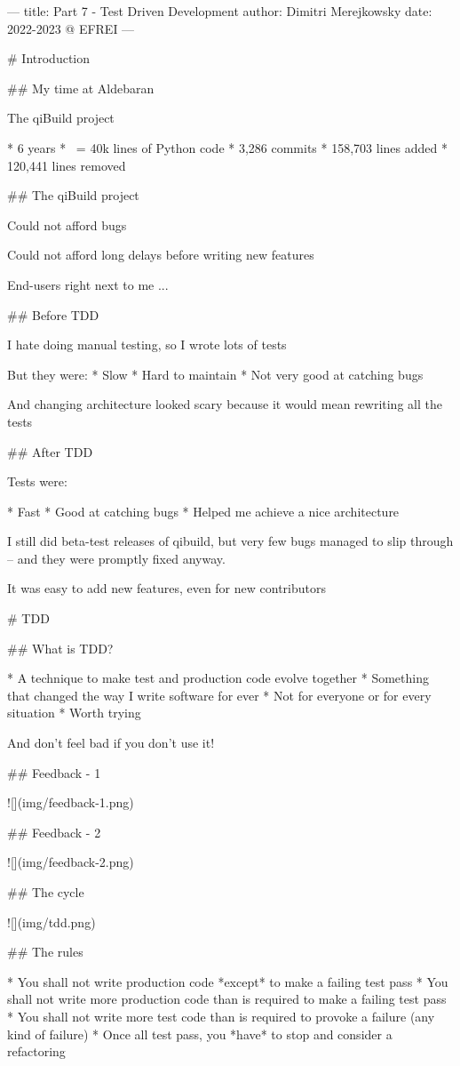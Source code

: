 ---
title: Part 7 - Test Driven Development
author: Dimitri Merejkowsky
date: 2022-2023 @ EFREI
---

#  Introduction

## My time at Aldebaran

The qiBuild project

* 6 years
* ~= 40k lines of Python code
* 3,286 commits
* 158,703 lines added
* 120,441 lines removed

## The qiBuild project

Could not afford bugs

Could not afford long delays before writing new features

End-users right next to me ...

## Before TDD

I hate doing manual testing, so I wrote lots of tests

But they were:
* Slow
* Hard to maintain
* Not very good at catching bugs

And changing architecture looked scary because it would mean rewriting all the tests

## After TDD

Tests were:

* Fast
* Good at catching bugs
* Helped me achieve a nice architecture

I still did beta-test releases of qibuild, but very few bugs managed to
slip through – and they were promptly fixed anyway.

It was easy to add new features, even for new contributors

# TDD

## What is TDD?

* A technique to make test and production code evolve together
* Something that changed the way I write software for ever
* Not for everyone or for every situation
* Worth trying

And don't feel bad if you don't use it!


## Feedback - 1

![](img/feedback-1.png)

## Feedback - 2

![](img/feedback-2.png)


## The cycle

![](img/tdd.png)

## The rules

* You shall not write production code *except* to make a failing test pass
* You shall not write more production code than is required to make a failing test pass
* You shall not write more test code than is required to provoke a failure (any kind of failure)
* Once all test pass, you *have* to stop and consider a refactoring


